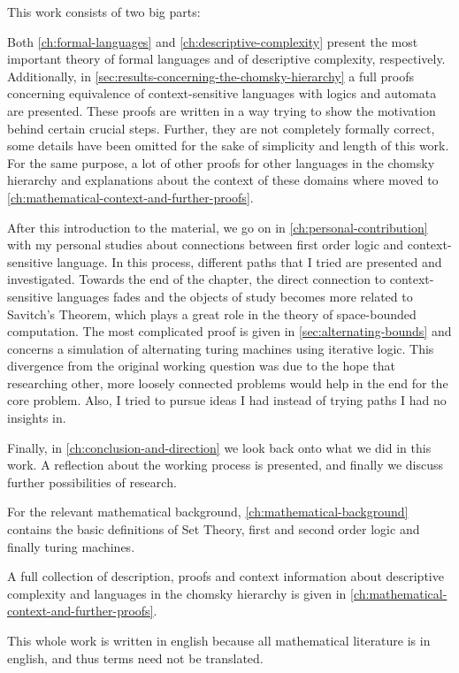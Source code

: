 This work consists of two big parts:

Both \cref{ch:formal-languages} and \cref{ch:descriptive-complexity} present the most important theory of formal languages and of descriptive complexity, respectively.
Additionally, in \cref{sec:results-concerning-the-chomsky-hierarchy} a full proofs concerning equivalence of context-sensitive languages with logics and automata are presented.
These proofs are written in a way trying to show the motivation behind certain crucial steps.
Further, they are not completely formally correct, some details have been omitted for the sake of simplicity and length of this work.
For the same purpose, a lot of other proofs for other languages in the chomsky hierarchy and explanations about the context of these domains where moved to \cref{ch:mathematical-context-and-further-proofs}.

After this introduction to the material, we go on in \cref{ch:personal-contribution} with my personal studies about connections between first order logic and context-sensitive language.
In this process, different paths that I tried are presented and investigated.
Towards the end of the chapter, the direct connection to context-sensitive languages fades and the objects of study becomes more related to Savitch's Theorem, which plays a great role in the theory of space-bounded computation.
The most complicated proof is given in \cref{sec:alternating-bounds} and concerns a simulation of alternating turing machines using iterative logic.
This divergence from the original working question was due to the hope that researching other, more loosely connected problems would help in the end for the core problem.
Also, I tried to pursue ideas I had instead of trying paths I had no insights in.

Finally, in \cref{ch:conclusion-and-direction} we look back onto what we did in this work.
A reflection about the working process is presented, and finally we discuss further possibilities of research.

For the relevant mathematical background, \cref{ch:mathematical-background} contains the basic definitions of Set Theory, first and second order logic and finally turing machines.

A full collection of description, proofs and context information about descriptive complexity and languages in the chomsky hierarchy is given in \cref{ch:mathematical-context-and-further-proofs}.

This whole work is written in english because all mathematical literature is in english, and thus terms need not be translated.